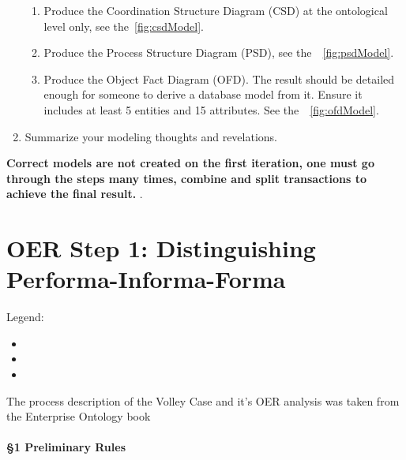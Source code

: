 \begin{enumerate}
    \begin{enumerate}
    	\item Produce the Coordination Structure Diagram (CSD) at the ontological level only, see the~\cref{fig:csdModel}.
    	\item Produce the Process Structure Diagram (PSD), see the~~\cref{fig:psdModel}.
    	\item Produce the Object Fact Diagram (OFD). The result should be detailed enough for someone to derive a database model from it. Ensure it includes at least 5 entities and 15 attributes. See the~~\cref{fig:ofdModel}.
    \end{enumerate}
    \item Summarize your modeling thoughts and revelations. 
\end{enumerate}

\textbf{Correct models are not created on the first iteration, one must go through the steps many times, combine and split transactions to achieve the final result. }. 

\section{OER Step 1: Distinguishing Performa-Informa-Forma}

Legend: 
\begin{itemize}
    \item {}
    \item {}
    \item {}
\end{itemize}

The process description of the Volley Case and it's OER analysis was taken from the Enterprise Ontology book~\cite{dietz2020enterprise}

\paragraph{\S 1 Preliminary Rules}

